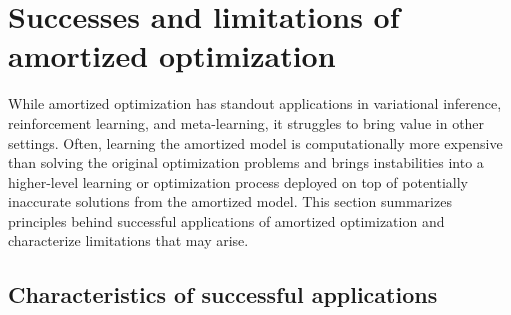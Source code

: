 \section{Successes and limitations of amortized optimization}
While amortized optimization has standout applications in
variational inference, reinforcement learning, and meta-learning,
it struggles to bring value in other settings.
Often, learning the amortized model is computationally more
expensive than solving the original optimization problems and
brings instabilities into a higher-level learning or optimization
process deployed on top of potentially inaccurate solutions
from the amortized model.
This section summarizes principles behind successful applications
of amortized optimization and characterize limitations that
may arise.

\subsection*{Characteristics of successful applications}
